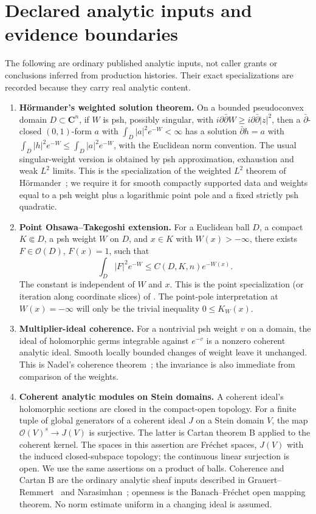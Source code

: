 \documentclass[11pt]{article}
\newcommand{\OO}{\mathcal O}
\theoremstyle{definition}
\begin{document}
\section{Declared analytic inputs and evidence boundaries}\label{sec:inputs}
The following are ordinary published analytic inputs, not caller
grants or conclusions inferred from production histories.
Their exact specializations are recorded because they carry real
analytic content.
\begin{enumerate}
\item[(H)] \textbf{H\"ormander's weighted solution theorem.}
On a bounded pseudoconvex domain $D\subset\mathbf C^n$, if $W$ is
psh, possibly singular, with
$i\partial\bar\partial W\geq i\partial\bar\partial|z|^2$, then a
$\bar\partial$-closed $(0,1)$-form $a$ with
$\int_D|a|^2e^{-W}<\infty$ has a solution $\bar\partial h=a$ with
$\int_D|h|^2e^{-W}\leq\int_D|a|^2e^{-W}$, with the Euclidean
norm convention. The usual singular-weight version is obtained by
psh approximation, exhaustion and weak $L^2$ limits. This is the
specialization of the weighted $L^2$ theorem of
H\"ormander~\cite{H65,H90}; we require it for smooth compactly
supported data and weights equal to a psh weight plus a logarithmic
point pole and a fixed strictly psh quadratic.
\item[(O)] \textbf{Point Ohsawa--Takegoshi extension.}
For a Euclidean ball $D$, a compact $K\Subset D$, a psh weight $W$
on $D$, and $x\in K$ with $W(x)>-\infty$, there exists
$F\in\OO(D)$, $F(x)=1$, such that
\[
 \int_D|F|^2e^{-W}\leq C(D,K,n)e^{-W(x)}.
\]
The constant is independent of $W$ and $x$. This is the point
specialization (or iteration along coordinate slices) of
\cite{OT87}. The point-pole interpretation at $W(x)=-\infty$
will only be the trivial inequality $0\leq K_W(x)$.
\item[(N)] \textbf{Multiplier-ideal coherence.}
For a nontrivial psh weight $v$ on a domain, the ideal of holomorphic
germs integrable against $e^{-v}$ is a nonzero coherent analytic
ideal. Smooth locally bounded changes of weight leave it unchanged.
This is Nadel's coherence theorem~\cite{N90}; the invariance is also
immediate from comparison of the weights.
\item[(C)] \textbf{Coherent analytic modules on Stein domains.}
A coherent ideal's holomorphic sections are closed in the
compact-open topology. For a finite tuple of global generators of
a coherent ideal $J$ on a Stein domain $V$, the map
$\OO(V)^s\longrightarrow J(V)$ is surjective. The latter is Cartan
theorem B applied to the coherent kernel. The spaces in this assertion
are Fr\'echet spaces, $J(V)$ with the induced closed-subspace topology;
the continuous linear surjection is open. We use the same assertions
on a product of balls. Coherence and Cartan B are the ordinary analytic
sheaf inputs described in Grauert--Remmert~\cite{GR84} and
Narasimhan~\cite{Nar66}; openness is the Banach--Fr\'echet open mapping
theorem. No norm estimate uniform in a changing ideal is assumed.
\end{enumerate}
\end{document}
